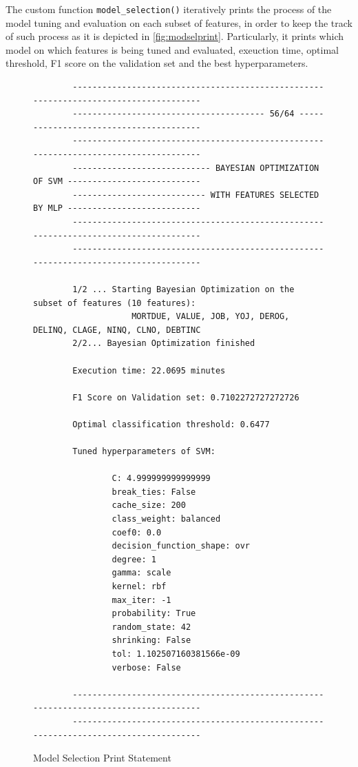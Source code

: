         
        
        The custom function \lstinline{model_selection()} iteratively prints the process of the model tuning and evaluation on each subset of features, in order to keep the track of such process as it is depicted in \autoref{fig:modselprint}.
        Particularly, it prints which model on which features is being tuned and evaluated, exeuction time, optimal threshold, F1 score on the validation set and the best hyperparameters.
        
        \begin{figure}[H]
            \centering\caption{Model Selection Print Statement}
            \label{fig:modselprint}
        
        {\fontsize{8.8}{11}\selectfont 
        \begin{verbatim}
        -------------------------------------------------------------------------------------
        --------------------------------------- 56/64 ---------------------------------------
        -------------------------------------------------------------------------------------
        ---------------------------- BAYESIAN OPTIMIZATION OF SVM ---------------------------
        --------------------------- WITH FEATURES SELECTED BY MLP ---------------------------
        -------------------------------------------------------------------------------------
        ------------------------------------------------------------------------------------- 
            
        1/2 ... Starting Bayesian Optimization on the subset of features (10 features):
                    MORTDUE, VALUE, JOB, YOJ, DEROG, DELINQ, CLAGE, NINQ, CLNO, DEBTINC
        2/2... Bayesian Optimization finished 
            
        Execution time: 22.0695 minutes 
        
        F1 Score on Validation set: 0.7102272727272726 
            
        Optimal classification threshold: 0.6477 
            
        Tuned hyperparameters of SVM: 
            
                C: 4.999999999999999
                break_ties: False
                cache_size: 200
                class_weight: balanced
                coef0: 0.0
                decision_function_shape: ovr
                degree: 1
                gamma: scale
                kernel: rbf
                max_iter: -1
                probability: True
                random_state: 42
                shrinking: False
                tol: 1.102507160381566e-09
                verbose: False
        
        -------------------------------------------------------------------------------------
        ------------------------------------------------------------------------------------- 
        \end{verbatim}
        }
        \vspace{0em}
        \end{figure}
        
